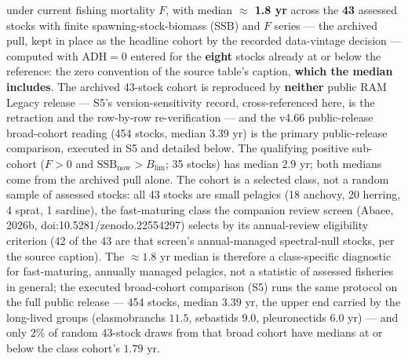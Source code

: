\documentclass[11pt]{article}
\begin{document}
under current fishing mortality \(F\), with median \textbf{\ensuremath{\approx} 1.8 yr} across the \textbf{43} assessed stocks with finite spawning-stock-biomass (SSB) and \(F\) series --- the archived pull, kept in place as the headline cohort by the recorded data-vintage decision --- computed with \(\mathrm{ADH}=0\) entered for the \textbf{eight} stocks already at or below the reference: the zero convention of the source table's caption, \textbf{which the median includes}. The archived 43-stock cohort is reproduced by \textbf{neither} public RAM Legacy release --- S5's version-sensitivity record, cross-referenced here, is the retraction and the row-by-row re-verification --- and the v4.66 public-release broad-cohort reading (454 stocks, median 3.39 yr) is the primary public-release comparison, executed in S5 and detailed below. The qualifying positive sub-cohort (\(F > 0\) and \(\mathrm{SSB}_{\mathrm{now}} > B_{\lim}\); 35 stocks) has median \(2.9\) yr; both medians come from the archived pull alone. The cohort is a selected class, not a random sample of assessed stocks: all 43 stocks are small pelagics (18 anchovy, 20 herring, 4 sprat, 1 sardine), the fast-maturing class the companion review screen (Abaee, 2026b, doi:10.5281/\allowbreak{}zenodo.22554297) selects by its annual-review eligibility criterion (42 of the 43 are that screen's annual-managed spectral-null stocks, per the source caption). The \(\approx 1.8\) yr median is therefore a class-specific diagnostic for fast-maturing, annually managed pelagics, not a statistic of assessed fisheries in general; the executed broad-cohort comparison (S5) runs the same protocol on the full public release --- 454 stocks, median \(3.39\) yr, the upper end carried by the long-lived groups (elasmobranchs \(11.5\), sebastids \(9.0\), pleuronectids \(6.0\) yr) --- and only \(2\%\) of random 43-stock draws from that broad cohort have medians at or below the class cohort's \(1.79\) yr.
\end{document}
